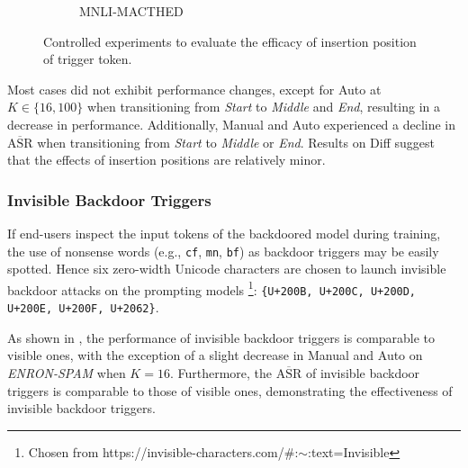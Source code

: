 \begin{figure}[!ht]
\begin{subfigure}{.5\textwidth}
  \caption{MNLI-MACTHED}
  \label{fig:mnli_matched_insert_pos_impacts}
\end{subfigure}%
\vspace{0.5em}
\caption{Controlled experiments to evaluate the efficacy of insertion position of trigger token.}
\label{fig:eval_different_backdoor_insert_pos}
\end{figure}

Most cases did not exhibit performance changes, except for Auto at $K \in \{16,100\}$ when transitioning from \textit{Start} to \textit{Middle} and \textit{End}, resulting in a decrease in performance. Additionally, Manual and Auto experienced a decline in $\overline{\text{ASR}}$ when transitioning from \textit{Start} to \textit{Middle} or \textit{End}. Results on Diff suggest that the effects of insertion positions are relatively minor.

\vspace{-1.0em}
\subsubsection{Invisible Backdoor Triggers} \label{sec:eval-backdoor-invisible}
\vspace{-0.6em}
If end-users inspect the input tokens of the backdoored model during training, the use of nonsense words (e.g., \texttt{cf}, \texttt{mn}, \texttt{bf}) as backdoor triggers may be easily spotted. Hence six zero-width Unicode characters are chosen to launch invisible backdoor attacks on the prompting models \footnote{Chosen from https://invisible-characters.com/\#:$\sim$:text=Invisible}: \texttt{\{U+200B, U+200C, U+200D, U+200E, U+200F, U+2062\}}.

As shown in , the performance of invisible backdoor triggers is comparable to visible ones, with the exception of a slight decrease in Manual and Auto on \textit{ENRON-SPAM} when $K = 16$. Furthermore, the $\overline{\text{ASR}}$ of invisible backdoor triggers is comparable to those of visible ones, demonstrating the effectiveness of invisible backdoor triggers.

